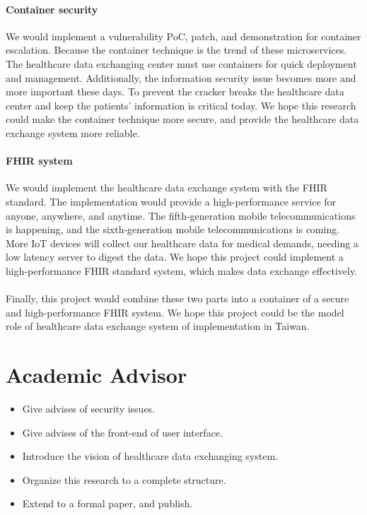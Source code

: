 \documentclass[12pt,a4paper]{article}
\begin{document}
\paragraph{Container security}
We would implement a vulnerability PoC, patch, and demonstration for container escalation.
Because the container technique is the trend of these microservices. The healthcare data
exchanging center must use containers for quick deployment and management. Additionally, the
information security issue becomes more and more important these days. To prevent the
cracker breaks the healthcare data center and keep the patients' information is critical
today. We hope this research could make the container technique more secure, and provide
the healthcare data exchange system more reliable.

\paragraph{FHIR system}
We would implement the healthcare data exchange system with the FHIR standard. The implementation
would provide a high-performance service for anyone, anywhere, and anytime. The fifth-generation
mobile telecommunications is happening, and the sixth-generation mobile telecommunications is
coming.  More IoT devices will collect our healthcare data for medical demands, needing a low
latency server to digest the data. We hope this project could implement a high-performance FHIR
standard system, which makes data exchange effectively.
\paragraph{}
Finally, this project would combine these two parts into a container of a secure and
high-performance FHIR system. We hope this project could be the model role of healthcare
data exchange system of implementation in Taiwan.

\printbibliography[heading=bibnumbered]

\section{Academic Advisor}
\begin{itemize}
  \item Give advises of security issues.
  \item Give advises of the front-end of user interface.
  \item Introduce the vision of healthcare data exchanging system.
  \item Organize this research to a complete structure.
  \item Extend to a formal paper, and publish.
\end{itemize}
\end{document}
